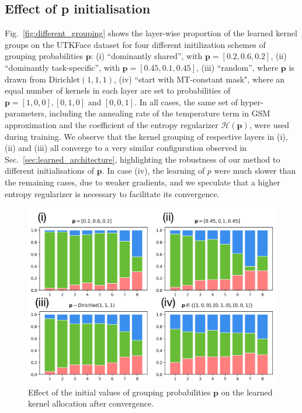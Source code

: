 \subsection{Effect of \textbf{p} initialisation}
Fig.~\ref{fig:different_grouping} shows the layer-wise proportion of the learned kernel groups on the UTKFace dataset for four different initilization schemes of grouping probabilities $\mathbf{p}$: (i) ``dominantly shared'', with $\mathbf{p}=[0.2, 0.6, 0.2]$, (ii) ``dominantly task-specific'', with $\mathbf{p}=[0.45, 0.1, 0.45]$, (iii) ``random'', where $\mathbf{p}$ is drawn from $\text{Dirichlet}(1,1,1)$, (iv) ``start with MT-constant mask", where an equal number of kernels in each layer are set to probabilities of $\mathbf{p}= [1,0,0],[0,1,0]$ and $[0,0,1]$. In all cases, the same set of hyper-parameters, including the annealing rate of the temperature term in GSM approximation and the coefficient of the entropy regularizer $\mathcal{H}(\mathbf{p})$, were used during training. We observe that the kernel grouping of respective layers in (i), (ii) and (iii) all converge to a very similar configuration observed in Sec.~\ref{sec:learned_architecture}, highlighting the robustness of our method to different initialisations of $\mathbf{p}$. In case (iv), the learning of $p$ were much slower than the remaining cases, due to weaker gradients, and we speculate that a higher entropy regularizer is necessary to facilitate its convergence. 


\begin{figure}[ht]
	\center
	\includegraphics[width= \linewidth]{chapter_6/figures/DIFFERENT_P.pdf}
	\caption{Effect of the initial values of grouping probabilities $\mathbf{p}$ on the learned kernel allocation after convergence. }
    \label{fig:performance_on_small_data}
\end{figure}



